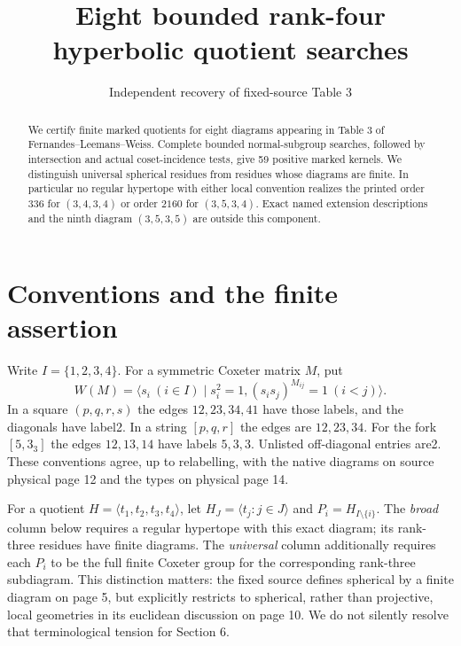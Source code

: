 \documentclass[11pt]{article}
\title{Eight bounded rank-four hyperbolic quotient searches}
\author{Independent recovery of fixed-source Table 3}
\date{}
\begin{document}
\maketitle
\begin{abstract}
We certify finite marked quotients for eight diagrams appearing in Table 3
of Fernandes--Leemans--Weiss. Complete bounded normal-subgroup searches,
followed by intersection and actual coset-incidence tests, give 59 positive
marked kernels. We distinguish universal spherical residues from residues
whose diagrams are finite. In particular no regular hypertope with either
local convention realizes the printed order $336$ for $(3,4,3,4)$ or order $2160$
for $(3,5,3,4)$. Exact named extension descriptions and the ninth diagram
$(3,5,3,5)$ are outside this component.
\end{abstract}

\section{Conventions and the finite assertion}
Write $I=\{1,2,3,4\}$. For a symmetric Coxeter matrix $M$, put
\[
 W(M)=\langle s_i\ (i\in I)\mid s_i^2=1,
                     (s_i s_j)^{M_{ij}}=1\ (i<j)\rangle.
\]
In a square $(p,q,r,s)$ the edges $12,23,34,41$ have those labels,
and the diagonals have label2. In a string $[p,q,r]$ the edges are
$12,23,34$. For the fork $[5,3_3]$ the edges $12,13,14$ have
labels $5,3,3$. Unlisted off-diagonal entries are2.
These conventions agree, up to relabelling, with the native diagrams on
source physical page 12 and the types on physical page 14.

For a quotient $H=\langle t_1,t_2,t_3,t_4\rangle$, let
$H_J=\langle t_j:j\in J\rangle$ and $P_i=H_{I\setminus\{i\}}$.
The \emph{broad} column below requires a regular hypertope with this
exact diagram; its rank-three residues have finite diagrams. The
\emph{universal} column additionally requires each $P_i$ to be the full
finite Coxeter group for the corresponding rank-three subdiagram.
This distinction matters: the fixed source defines spherical by a finite
diagram on page 5, but explicitly restricts to spherical, rather than
projective, local geometries in its euclidean discussion on page 10.
We do not silently resolve that terminological tension for Section 6.
\end{document}
